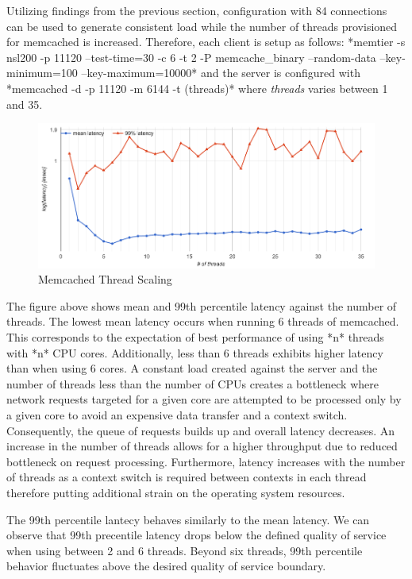 Utilizing findings from the previous section, configuration with 84 connections can be used to generate consistent load while the number of threads provisioned for memcached is increased. Therefore, each client is setup as follows: *memtier -s nsl200 -p 11120 --test-time=30 -c 6 -t 2 -P memcache_binary --random-data --key-minimum=100 --key-maximum=10000* and the server is configured with *memcached -d -p 11120 -m 6144 -t (threads)* where \emph{threads} varies between 1 and 35.

\begin{figure}[h]
    \includegraphics[width=\textwidth]{./res/5_threads_latency.png}
    \caption{Memcached Thread Scaling}
    \label{fig:memcached-threads}
\end{figure}

The figure above shows mean and 99th percentile latency against the number of threads. The lowest mean latency occurs when running 6 threads of memcached. This corresponds to the expectation of best performance of using *n* threads with *n* CPU cores. Additionally, less than 6 threads exhibits higher latency than when using 6 cores. A constant load created against the server and the number of threads less than the number of CPUs creates a bottleneck where network requests targeted for a given core are attempted to be processed only by a given core to avoid an expensive data transfer and a context switch. Consequently, the queue of requests builds up and overall latency decreases. An increase in the number of threads allows for a higher throughput due to reduced bottleneck on request processing. Furthermore, latency increases with the number of threads as a context switch is required between contexts in each thread therefore putting additional strain on the operating system resources.

The 99th percentile lantecy behaves similarly to the mean latency. We can observe that 99th precentile latency drops below the defined quality of service when using between 2 and 6 threads. Beyond six threads, 99th percentile behavior fluctuates above the desired quality of service boundary.

